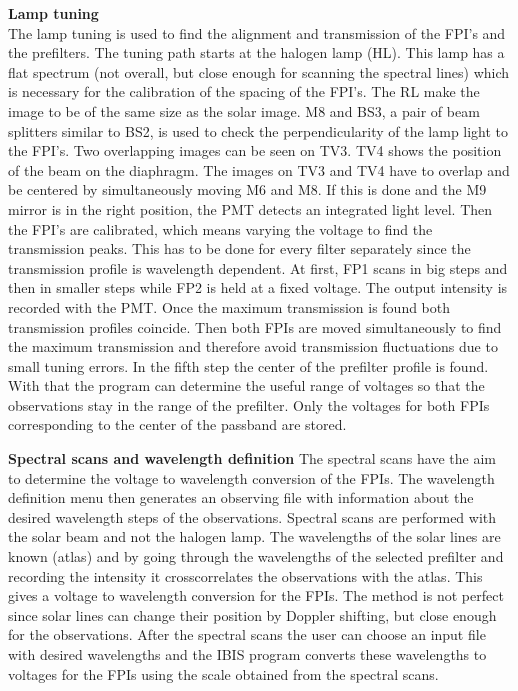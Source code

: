 \documentclass[a4paper,11pt]{article}
\begin{document}
\textbf{Lamp tuning}\\
The lamp tuning is used to find the alignment and transmission of the FPI's and the prefilters.
The tuning path starts at the halogen lamp (HL). This lamp has a flat spectrum (not overall, but close enough for scanning the spectral lines) which is necessary for the calibration of the spacing of the FPI's. The RL make the  image to be of the same size as the solar image. M8 and BS3, a pair of beam splitters similar to BS2, is used to check the perpendicularity of the lamp light to the FPI's. Two overlapping images can be seen on TV3. TV4 shows the position of the beam on the diaphragm. The images on TV3 and TV4 have to overlap and be centered by simultaneously moving M6 and M8. If this is done and the M9 mirror is in the right position, the PMT detects an integrated light level. Then the FPI's are calibrated, which means varying the voltage to find the transmission peaks. This has to be done for every filter separately since the transmission profile is wavelength dependent. At first, FP1 scans in big steps and then in smaller steps while FP2 is held at a fixed voltage. The output intensity is recorded with the PMT. Once the maximum transmission is found both transmission profiles coincide. Then both FPIs are moved simultaneously to find the maximum transmission and therefore avoid transmission fluctuations due to small tuning errors. In the fifth step the center of the prefilter profile is found. With that the program can determine the useful range of voltages so that the observations stay in the range of the prefilter. Only the voltages for both FPIs corresponding to the center of the passband are stored.


\textbf{Spectral scans and wavelength definition}
The spectral scans have the aim to determine the voltage to wavelength conversion of the FPIs. The wavelength definition menu then generates an observing file with information about the desired wavelength steps of the observations. Spectral scans are performed with the solar beam and not the halogen lamp. The wavelengths of the solar lines are known (atlas) and by going through the wavelengths of the selected prefilter and recording the intensity it crosscorrelates the observations with the atlas. This gives a voltage to wavelength conversion for the FPIs. The method is not perfect since solar lines can change their position by Doppler shifting, but close enough for the observations. After the spectral scans the user can choose an input file with desired wavelengths and the IBIS program converts these wavelengths to voltages for the FPIs using the scale obtained from the spectral scans.
\end{document}
